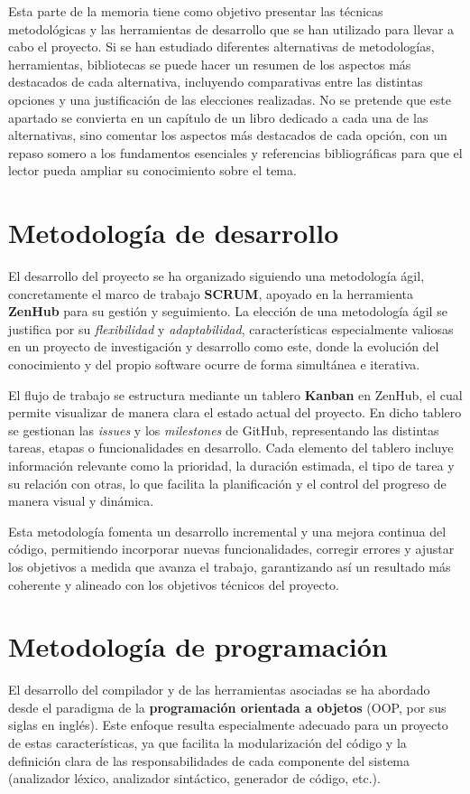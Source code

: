 
Esta parte de la memoria tiene como objetivo presentar las técnicas metodológicas y las herramientas de desarrollo que se han utilizado para llevar a cabo el proyecto. Si se han estudiado diferentes alternativas de metodologías, herramientas, bibliotecas se puede hacer un resumen de los aspectos más destacados de cada alternativa, incluyendo comparativas entre las distintas opciones y una justificación de las elecciones realizadas. 
No se pretende que este apartado se convierta en un capítulo de un libro dedicado a cada una de las alternativas, sino comentar los aspectos más destacados de cada opción, con un repaso somero a los fundamentos esenciales y referencias bibliográficas para que el lector pueda ampliar su conocimiento sobre el tema.

\section{Metodología de desarrollo}
El desarrollo del proyecto se ha organizado siguiendo una metodología ágil, concretamente el marco de trabajo \textbf{SCRUM}, apoyado en la herramienta \textbf{ZenHub} para su gestión y seguimiento. La elección de una metodología ágil se justifica por su \textit{flexibilidad} y \textit{adaptabilidad}, características especialmente valiosas en un proyecto de investigación y desarrollo como este, donde la evolución del conocimiento y del propio software ocurre de forma simultánea e iterativa.

El flujo de trabajo se estructura mediante un tablero \textbf{Kanban} en ZenHub, el cual permite visualizar de manera clara el estado actual del proyecto. En dicho tablero se gestionan las \textit{issues} y los \textit{milestones} de GitHub, representando las distintas tareas, etapas o funcionalidades en desarrollo.  
Cada elemento del tablero incluye información relevante como la prioridad, la duración estimada, el tipo de tarea y su relación con otras, lo que facilita la planificación y el control del progreso de manera visual y dinámica.

Esta metodología fomenta un desarrollo incremental y una mejora continua del código, permitiendo incorporar nuevas funcionalidades, corregir errores y ajustar los objetivos a medida que avanza el trabajo, garantizando así un resultado más coherente y alineado con los objetivos técnicos del proyecto.

\section{Metodología de programación}
El desarrollo del compilador y de las herramientas asociadas se ha abordado desde el paradigma de la \textbf{programación orientada a objetos} (OOP, por sus siglas en inglés). Este enfoque resulta especialmente adecuado para un proyecto de estas características, ya que facilita la modularización del código y la definición clara de las responsabilidades de cada componente del sistema (analizador léxico, analizador sintáctico, generador de código, etc.).

